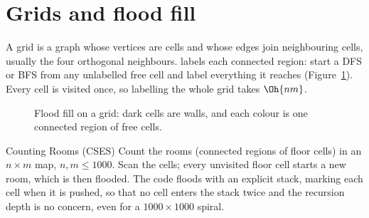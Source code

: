 \section[Grids and flood fill]{Grids and flood fill \hfill \silver}\label{sec:grids}

A grid is a graph whose vertices are cells and whose edges join neighbouring cells, usually the four orthogonal neighbours.
 labels each connected region: start a DFS or BFS from any unlabelled free cell and label everything it
reaches (Figure~\ref{fig:floodfill}). Every cell is visited once, so labelling the whole grid takes $\Oh{nm}$.

\begin{figure}[htbp]
\centering
{}
\caption{Flood fill on a grid: dark cells are walls, and each colour is one connected region of free cells.}
\label{fig:floodfill}
\end{figure}

\begin{problem}{Counting Rooms (CSES)}
Count the rooms (connected regions of floor cells) in an $n \times m$ map, $n, m \le 1000$.
\solution Scan the cells; every unvisited floor cell starts a new room, which is then flooded. The code floods with an
explicit stack, marking each cell when it is pushed, so that no cell enters the stack twice and the recursion depth is no
concern, even for a $1000 \times 1000$ spiral.
\end{problem}

